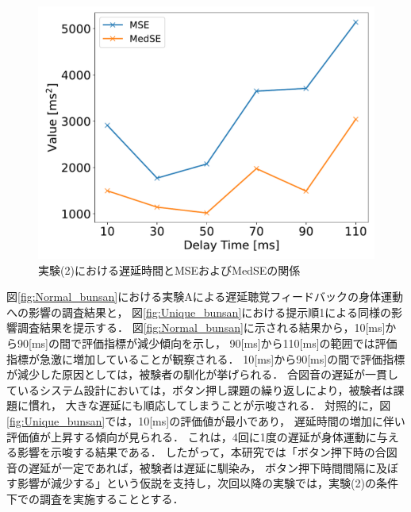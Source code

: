 \begin{figure}[bt]
  \centering
  \includegraphics[scale=0.5]{figures/Yobi/Var/Yobi-MSE-MedSE.pdf}
  \caption{実験(2)における遅延時間とMSEおよびMedSEの関係}
  \label{fig:Yobi_MSE_MedSE}
\end{figure}
図\ref{fig:Normal_bunsan}における実験Aによる遅延聴覚フィードバックの身体運動への影響の調査結果と，
図\ref{fig:Unique_bunsan}における提示順1による同様の影響調査結果を提示する．
図\ref{fig:Normal_bunsan}に示される結果から，10[ms]から90[ms]の間で評価指標が減少傾向を示し，
90[ms]から110[ms]の範囲では評価指標が急激に増加していることが観察される．
10[ms]から90[ms]の間で評価指標が減少した原因としては，被験者の馴化が挙げられる．
合図音の遅延が一貫しているシステム設計においては，ボタン押し課題の繰り返しにより，被験者は課題に慣れ，
大きな遅延にも順応してしまうことが示唆される．
対照的に，図\ref{fig:Unique_bunsan}では，10[ms]の評価値が最小であり，
遅延時間の増加に伴い評価値が上昇する傾向が見られる．
これは，4回に1度の遅延が身体運動に与える影響を示唆する結果である．
したがって，本研究では「ボタン押下時の合図音の遅延が一定であれば，被験者は遅延に馴染み，
ボタン押下時間間隔に及ぼす影響が減少する」という仮説を支持し，次回以降の実験では，実験(2)の条件下での調査を実施することとする．

\newpage \newpage
